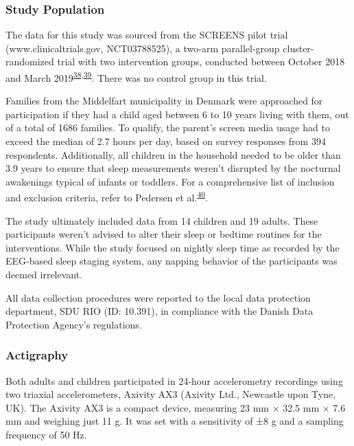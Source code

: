 \documentclass[
  9pt,
]{article}
\begin{document}
\hypertarget{study-population}{%
\subsubsection{Study Population}\label{study-population}}

The data for this study was sourced from the SCREENS pilot trial
(www.clinicaltrials.gov, NCT03788525), a two-arm parallel-group
cluster-randomized trial with two intervention groups, conducted between
October 2018 and March
2019\textsuperscript{\protect\hyperlink{ref-rasmussen_feasibility_2021}{38},\protect\hyperlink{ref-rasmussen_short-term_2020}{39}}.
There was no control group in this trial.

Families from the Middelfart municipality in Denmark were approached for
participation if they had a child aged between 6 to 10 years living with
them, out of a total of 1686 families. To qualify, the parent's screen
media usage had to exceed the median of 2.7 hours per day, based on
survey responses from 394 respondents. Additionally, all children in the
household needed to be older than 3.9 years to ensure that sleep
measurements weren't disrupted by the nocturnal awakenings typical of
infants or toddlers. For a comprehensive list of inclusion and exclusion
criteria, refer to Pedersen et
al.\textsuperscript{\protect\hyperlink{ref-pedersen_self-administered_2021}{40}}.

The study ultimately included data from 14 children and 19 adults. These
participants weren't advised to alter their sleep or bedtime routines
for the interventions. While the study focused on nightly sleep time as
recorded by the EEG-based sleep staging system, any napping behavior of
the participants was deemed irrelevant.

All data collection procedures were reported to the local data
protection department, SDU RIO (ID: 10.391), in compliance with the
Danish Data Protection Agency's regulations.

\hypertarget{actigraphy}{%
\subsubsection{Actigraphy}\label{actigraphy}}

Both adults and children participated in 24-hour accelerometry
recordings using two triaxial accelerometers, Axivity AX3 (Axivity Ltd.,
Newcastle upon Tyne, UK). The Axivity AX3 is a compact device, measuring
23 mm × 32.5 mm × 7.6 mm and weighing just 11 g. It was set with a
sensitivity of ±8 g and a sampling frequency of 50 Hz.
\end{document}
